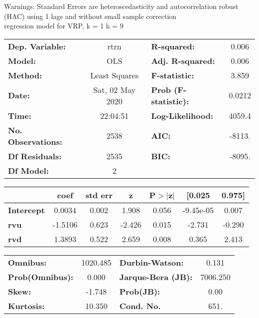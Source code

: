Warnings: \newline
 [1] Standard Errors are heteroscedasticity and autocorrelation robust (HAC) using 1 lags and without small sample correction\\ 

regression model for VRP, k = 1 h = 9\begin{center}
\begin{tabular}{lclc}
\toprule
\textbf{Dep. Variable:}    &       rtrn       & \textbf{  R-squared:         } &     0.006   \\
\textbf{Model:}            &       OLS        & \textbf{  Adj. R-squared:    } &     0.006   \\
\textbf{Method:}           &  Least Squares   & \textbf{  F-statistic:       } &     3.859   \\
\textbf{Date:}             & Sat, 02 May 2020 & \textbf{  Prob (F-statistic):} &   0.0212    \\
\textbf{Time:}             &     22:04:51     & \textbf{  Log-Likelihood:    } &    4059.4   \\
\textbf{No. Observations:} &        2538      & \textbf{  AIC:               } &    -8113.   \\
\textbf{Df Residuals:}     &        2535      & \textbf{  BIC:               } &    -8095.   \\
\textbf{Df Model:}         &           2      & \textbf{                     } &             \\
\bottomrule
\end{tabular}
\begin{tabular}{lcccccc}
                   & \textbf{coef} & \textbf{std err} & \textbf{z} & \textbf{P$> |$z$|$} & \textbf{[0.025} & \textbf{0.975]}  \\
\midrule
\textbf{Intercept} &       0.0034  &        0.002     &     1.908  &         0.056        &    -9.45e-05    &        0.007     \\
\textbf{rvu}       &      -1.5106  &        0.623     &    -2.426  &         0.015        &       -2.731    &       -0.290     \\
\textbf{rvd}       &       1.3893  &        0.522     &     2.659  &         0.008        &        0.365    &        2.413     \\
\bottomrule
\end{tabular}
\begin{tabular}{lclc}
\textbf{Omnibus:}       & 1020.485 & \textbf{  Durbin-Watson:     } &    0.131  \\
\textbf{Prob(Omnibus):} &   0.000  & \textbf{  Jarque-Bera (JB):  } & 7006.250  \\
\textbf{Skew:}          &  -1.748  & \textbf{  Prob(JB):          } &     0.00  \\
\textbf{Kurtosis:}      &  10.350  & \textbf{  Cond. No.          } &     651.  \\
\bottomrule
\end{tabular}
\end{center}

